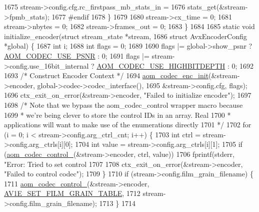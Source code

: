 \begin{DoxyCodeInclude}
{{{{{{{{{{{{{{{{{{{{{{{{{{{{{{1675     stream->config.cfg.rc\_firstpass\_mb\_stats\_in =
1676         stats\_get(&stream->fpmb\_stats);
1677 \textcolor{preprocessor}{#endif}
1678   \}
1679 
1680   stream->cx\_time = 0;
1681   stream->nbytes = 0;
1682   stream->frames\_out = 0;
1683 \}
1684 
1685 \textcolor{keyword}{static} \textcolor{keywordtype}{void} initialize\_encoder(\textcolor{keyword}{struct} stream\_state *stream,
1686                                \textcolor{keyword}{struct} AvxEncoderConfig *global) \{
1687   \textcolor{keywordtype}{int} i;
1688   \textcolor{keywordtype}{int} flags = 0;
1689 
1690   flags |= global->show\_psnr ? \hyperlink{group__encoder_gae722c9f9ba9b4ca8dba6bbe7c0692024}{AOM\_CODEC\_USE\_PSNR} : 0;
1691   flags |= stream->config.use\_16bit\_internal ? \hyperlink{group__encoder_gae30bbbdef18e9da3631b69c170533e92}{AOM\_CODEC\_USE\_HIGHBITDEPTH} : 0;
1692 
1693   \textcolor{comment}{/* Construct Encoder Context */}
1694   \hyperlink{group__encoder_gaade68a7d33d30f97dc9a596aa5e065d8}{aom\_codec\_enc\_init}(&stream->encoder, global->codec->codec\_interface(),
1695                      &stream->config.cfg, flags);
1696   ctx\_exit\_on\_error(&stream->encoder, \textcolor{stringliteral}{"Failed to initialize encoder"});
1697 
1698   \textcolor{comment}{/* Note that we bypass the aom\_codec\_control wrapper macro because}
1699 \textcolor{comment}{   * we're being clever to store the control IDs in an array. Real}
1700 \textcolor{comment}{   * applications will want to make use of the enumerations directly}
1701 \textcolor{comment}{   */}
1702   \textcolor{keywordflow}{for} (i = 0; i < stream->config.arg\_ctrl\_cnt; i++) \{
1703     \textcolor{keywordtype}{int} ctrl = stream->config.arg\_ctrls[i][0];
1704     \textcolor{keywordtype}{int} value = stream->config.arg\_ctrls[i][1];
1705     \textcolor{keywordflow}{if} (\hyperlink{group__codec_ga51eb332a40dcacc39000ab8e0be36b79}{aom\_codec\_control\_}(&stream->encoder, ctrl, value))
1706       fprintf(stderr, \textcolor{stringliteral}{"Error: Tried to set control %
1707 
1708     ctx\_exit\_on\_error(&stream->encoder, \textcolor{stringliteral}{"Failed to control codec"});
1709   \}
1710   \textcolor{keywordflow}{if} (stream->config.film\_grain\_filename) \{
1711     \hyperlink{group__codec_ga51eb332a40dcacc39000ab8e0be36b79}{aom\_codec\_control\_}(&stream->encoder, 
      \hyperlink{group__aom__encoder_ggae78dde67a6d78f332e9bdba0dde42db5ad5846c6f49d37e65a03c39e68d487097}{AV1E\_SET\_FILM\_GRAIN\_TABLE},
1712                        stream->config.film\_grain\_filename);
1713   \}
1714 
}}}}}}}}}}}}}}}}}}}}}}}}}}}}}}}
\end{DoxyCodeInclude}
